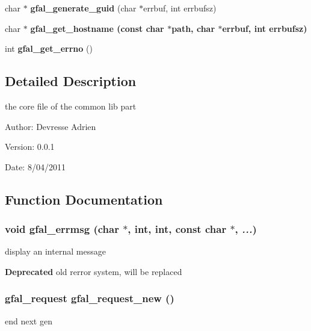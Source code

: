 \begin{CompactItemize}
\item 
char $\ast$ \textbf{gfal\_\-generate\_\-guid} (char $\ast$errbuf, int errbufsz)\label{group__internal__group_g8311ede197e204e57029165fbc3898d6}

\item 
char $\ast$ \bf{gfal\_\-get\_\-hostname} (const char $\ast$path, char $\ast$errbuf, int errbufsz)
\item 
int \textbf{gfal\_\-get\_\-errno} ()\label{gfal__common_8c_4f4c3163c72535da9dd42484905b1c7c}

\end{CompactItemize}


\subsection{Detailed Description}
the core file of the common lib part 

\begin{Desc}
\item[Author:]Devresse Adrien \end{Desc}
\begin{Desc}
\item[Version:]0.0.1 \end{Desc}
\begin{Desc}
\item[Date:]8/04/2011 \end{Desc}


\subsection{Function Documentation}
\subsubsection{\setlength{\rightskip}{0pt plus 5cm}void gfal\_\-errmsg (char $\ast$, int, int, const char $\ast$,  {\em ...})}\label{gfal__common_8c_e6fb0cae56e9344c2b6ed23001f7dcb5}


display an internal message 

\begin{Desc}
\item[\bf{Deprecated}]old rerror system, will be replaced \end{Desc}
\subsubsection{\setlength{\rightskip}{0pt plus 5cm}gfal\_\-request gfal\_\-request\_\-new ()}\label{gfal__common_8c_b5d503849656335232e56583b376ee22}


end next gen 